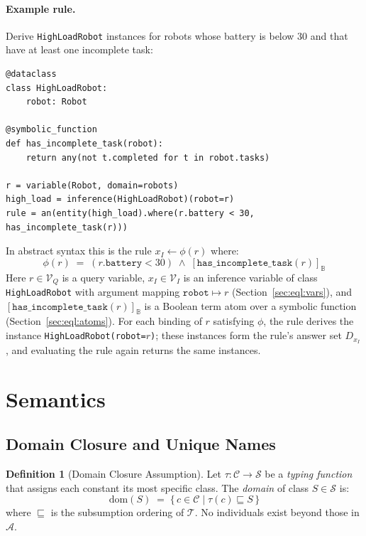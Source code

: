 \documentclass[11pt, a4paper]{article}
\theoremstyle{plain}
\theoremstyle{definition}
\newtheorem{definition}[theorem]{Definition}
\theoremstyle{remark}
\begin{document}
\paragraph{Example rule.}
Derive \texttt{HighLoadRobot} instances for robots whose battery is below 30 and that have at
least one incomplete task:

\begin{lstlisting}
@dataclass
class HighLoadRobot:
    robot: Robot

@symbolic_function
def has_incomplete_task(robot):
    return any(not t.completed for t in robot.tasks)

r = variable(Robot, domain=robots)
high_load = inference(HighLoadRobot)(robot=r)
rule = an(entity(high_load).where(r.battery < 30, has_incomplete_task(r)))
\end{lstlisting}

\noindent
In abstract syntax this is the rule $x_I \leftarrow \phi(r)$ where:
\[
  \phi(r) \;=\; (r.\mathtt{battery} < 30) \;\wedge\; [\mathtt{has\_incomplete\_task}(r)]_\mathbb{B}
\]
Here $r \in \mathcal{V}_Q$ is a query variable, $x_I \in \mathcal{V}_I$ is an inference
variable of class \texttt{HighLoadRobot} with argument mapping $\mathtt{robot} \mapsto r$
(Section~\ref{sec:eql:vars}), and $[\mathtt{has\_incomplete\_task}(r)]_\mathbb{B}$ is a Boolean
term atom over a symbolic function (Section~\ref{sec:eql:atoms}).  For each binding of $r$
satisfying $\phi$, the rule derives the instance \texttt{HighLoadRobot(robot=$r$)}; these instances
form the rule's answer set $D_{x_I}$, and evaluating the rule again returns the same instances.


\section{Semantics}
\label{sec:eql:semantics}

\subsection{Domain Closure and Unique Names}

\begin{definition}[Domain Closure Assumption]
\label{def:dca}
Let $\tau : \mathcal{C} \to \mathcal{S}$ be a \emph{typing function} that assigns each
constant its most specific class.  The \emph{domain} of class $S \in \mathcal{S}$ is:
\[
  \mathrm{dom}(S) \;=\; \{\,c \in \mathcal{C} \mid \tau(c) \sqsubseteq S\,\}
\]
where $\sqsubseteq$ is the subsumption ordering of $\mathcal{T}$.  No individuals exist beyond
those in $\mathcal{A}$.
\end{definition}
\end{document}
